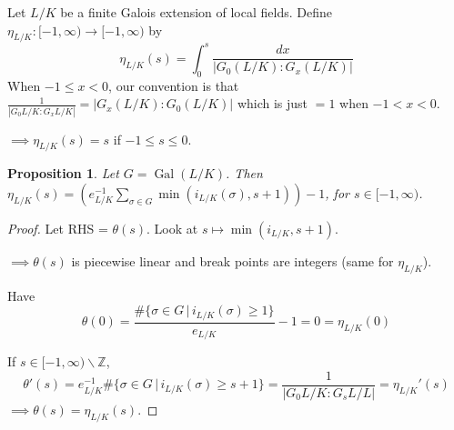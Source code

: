 \documentclass[a4paper]{article}
\newtheorem{prop}[definition]{Proposition}
\newcommand*\abs[1]{\left|#1\right|}
\DeclareMathOperator{\Gal}{Gal}
\begin{document}
Let $L/K$ be a finite Galois extension of local fields.
Define $\eta_{L/K}: [-1, \infty) \to [-1, \infty)$ by
$$\eta_{L/K}(s) = \int_{0}^{s} \frac{dx}{\abs{G_0(L/K):G_x(L/K)}}$$
When $-1 \leq x < 0 $, our convention is that
$\frac{1}{\abs{G_0{L/K}:G_x{L/K}}} = \abs{G_x(L/K) : G_0(L/K)}$ which is just $=1$ when $-1 < x < 0$.

$\implies \eta_{L/K}(s)=s$ if $-1 \leq s \leq 0$.

\begin{prop}
	Let $G=\Gal(L/K)$.
	Then $\eta_{L/K}(s) = \left(e_{L/K}^{-1} \sum_{\sigma \in G}\min(i_{L/K}(\sigma), s+1)\right) - 1$,
	for $s \in [-1, \infty)$.
	\label{88}
\end{prop}
\begin{proof}
	Let RHS = $\theta(s)$.
	Look at $s \mapsto \min(i_{L/K}, s+1)$.
	
	$\implies \theta(s)$ is piecewise linear and break points are integers (same for $\eta_{L/K}$).
	
	Have
	$$\theta(0) = \frac{\#\{\sigma \in G \,|\, i_{L/K}(\sigma) \geq 1 \}}{e_{L/K}} - 1 = 0 = \eta_{L/K}(0)$$
	
	If $s \in [-1, \infty) \backslash \mathbb{Z}$,
	$$\theta'(s) = e_{L/K}^{-1} \# \{\sigma \in G \,|\, i_{L/K}(\sigma) \geq s+1 \} = \frac{1}{\abs{G_0{L/K}:G_s{L/L}}} = \eta_{L/K}'(s)$$
	$\implies \theta(s) = \eta_{L/K}(s)$.
\end{proof}
\end{document}
